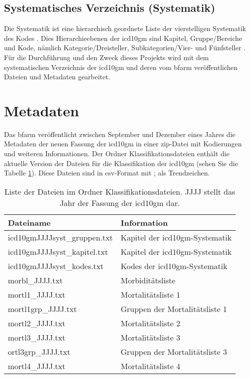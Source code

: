 \subsection{Systematisches Verzeichnis (Systematik)} 

Die Systematik ist eine hierarchisch geordnete Liste der vierstelligen Systematik des Kodes \cite{icd10syst, icd10systauf}. Dies Hierarchieebenen der \ac{icd10gm} sind Kapitel, Gruppe/Bereiche und Kode, nämlich Kategorie/Dreisteller, Subkategorien/Vier- und Fünfsteller \cite{icd10systauf}. Für die Durchführung und den Zweck dieses Projekts wird mit dem systematischen Verzeichnis der \ac{icd10gm} und deren vom \ac{bfarm} veröffentlichen Dateien und Metadaten gearbeitet. 
\section{Metadaten}

Das \ac{bfarm} veröffentlicht zwischen September und Dezember eines Jahres die Metadaten der neuen Fassung der \ac{icd10gm} in einer \ac{zip}-Datei mit Kodierungen und weiteren Informationen. Der Ordner Klassifikationsdateien enthält die aktuelle Version der Dateien für die Klassifikation der \ac{icd10gm} (sehen Sie die Tabelle \ref{tab:classfiles}). Diese Dateien sind in \ac{csv}-Format mit \glqq ;\grqq{} als Trendzeichen. 

\begin{table}[ht]
	\centering
	\small
	\caption[Inhalt im Ordner Klassifikationsdateien ]{Liste der Dateien im Ordner Klassifikationsdateien. \glqq JJJJ\grqq{} stellt das Jahr der Fassung der \ac{icd10gm} dar.}
	\label{tab:classfiles}
	\begin{tabular}{|l|l|}
		\hline
		\rowcolor{lightgray} Dateiname & Information \\
		\hline 
		\textsf{icd10gmJJJJsyst\_gruppen.txt} &  Kapitel der \ac{icd10gm}-Systematik \\ \hline
		\textsf{icd10gmJJJJsyst\_kapitel.txt} & Kapitel der \ac{icd10gm}-Systematik \\ \hline
		\textsf{icd10gmJJJJsyst\_kodes.txt} & Kodes der \ac{icd10gm}-Systematik \\ \hline
		\textsf{morbl\_JJJJ.txt} & Morbiditätsliste  \\ \hline
		\textsf{mortl1\_JJJJ.txt} & Mortalitätsliste 1 \\ \hline
		\textsf{mortl1grp\_JJJJ.txt} & Gruppen der Mortalitätsliste 1 \\ \hline
		\textsf{mortl2\_JJJJ.txt} & Mortalitätsliste 2 \\ \hline
		\textsf{mortl3\_JJJJ.txt} & Mortalitätsliste 3 \\ \hline
		\textsf{ortl3grp\_JJJJ.txt} & Gruppen der Mortalitätsliste 3 \\ \hline
		\textsf{mortl4\_JJJJ.txt} & Mortalitätsliste 4 \\ \hline		
	\end{tabular}
\end{table}

